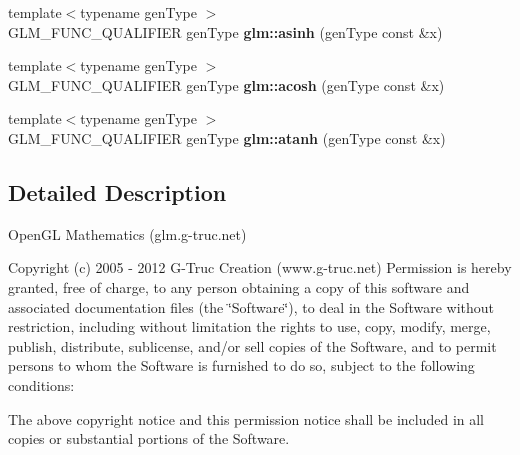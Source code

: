 \begin{DoxyCompactItemize}
\item 
\hypertarget{namespaceglm_a57a36c99a445dbc760f3fa78cebfef6d}{{\footnotesize template$<$typename gen\-Type $>$ }\\\-G\-L\-M\-\_\-\-F\-U\-N\-C\-\_\-\-Q\-U\-A\-L\-I\-F\-I\-E\-R gen\-Type {\bfseries glm\-::asinh} (gen\-Type const \&x)}\label{namespaceglm_a57a36c99a445dbc760f3fa78cebfef6d}

\item 
\hypertarget{namespaceglm_a1812d9f93b0d9a4baa2462ae87b280c3}{{\footnotesize template$<$typename gen\-Type $>$ }\\\-G\-L\-M\-\_\-\-F\-U\-N\-C\-\_\-\-Q\-U\-A\-L\-I\-F\-I\-E\-R gen\-Type {\bfseries glm\-::acosh} (gen\-Type const \&x)}\label{namespaceglm_a1812d9f93b0d9a4baa2462ae87b280c3}

\item 
\hypertarget{namespaceglm_a8e94362a2750aaf44e4aea98e42c8817}{{\footnotesize template$<$typename gen\-Type $>$ }\\\-G\-L\-M\-\_\-\-F\-U\-N\-C\-\_\-\-Q\-U\-A\-L\-I\-F\-I\-E\-R gen\-Type {\bfseries glm\-::atanh} (gen\-Type const \&x)}\label{namespaceglm_a8e94362a2750aaf44e4aea98e42c8817}

\end{DoxyCompactItemize}


\subsection{\-Detailed \-Description}
\-Open\-G\-L \-Mathematics (glm.\-g-\/truc.\-net)

\-Copyright (c) 2005 -\/ 2012 \-G-\/\-Truc \-Creation (www.\-g-\/truc.\-net) \-Permission is hereby granted, free of charge, to any person obtaining a copy of this software and associated documentation files (the \char`\"{}\-Software\char`\"{}), to deal in the \-Software without restriction, including without limitation the rights to use, copy, modify, merge, publish, distribute, sublicense, and/or sell copies of the \-Software, and to permit persons to whom the \-Software is furnished to do so, subject to the following conditions\-:

\-The above copyright notice and this permission notice shall be included in all copies or substantial portions of the \-Software.

